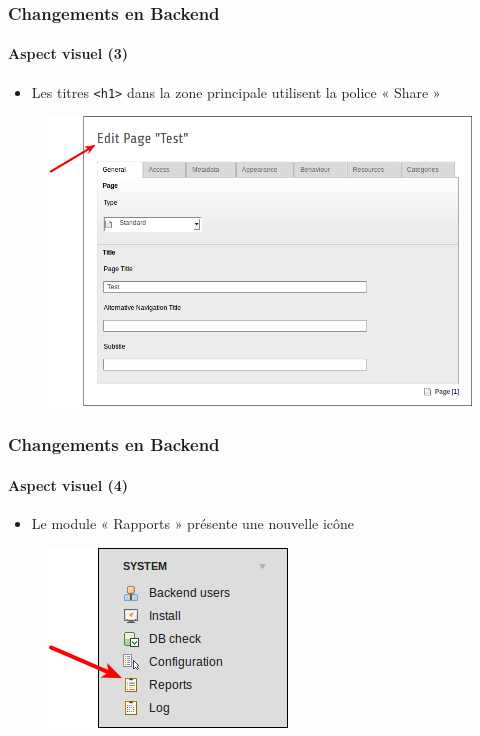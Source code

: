 
\begin{frame}[fragile]
	\frametitle{Changements en Backend}
	\framesubtitle{Aspect visuel (3)}

	\begin{itemize}
		\item Les titres \texttt{<h1>} dans la zone principale utilisent la police « Share »
	\end{itemize}

	\begin{figure}
		\includegraphics[width=0.6\linewidth]{Images/BackendChanges/ConsistantFont.png}
	\end{figure}

\end{frame}


\begin{frame}[fragile]
	\frametitle{Changements en Backend}
	\framesubtitle{Aspect visuel (4)}

	\begin{itemize}
		\item Le module « Rapports » présente une nouvelle icône
	\end{itemize}

	\begin{figure}
		\includegraphics[width=0.35\linewidth]{Images/BackendChanges/ModuleReportsIcon.png}
	\end{figure}

\end{frame}

